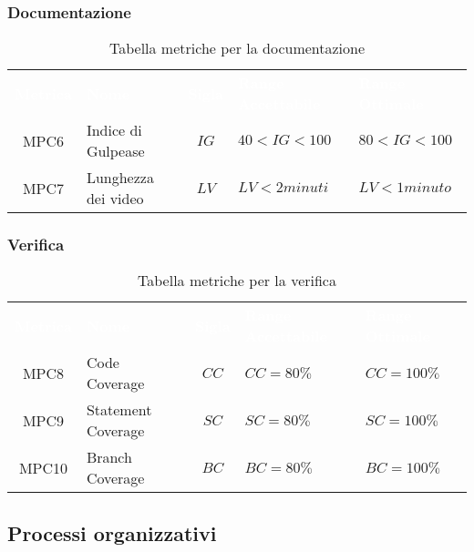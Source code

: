 \subsubsection{Documentazione}
    \renewcommand{\arraystretch}{1.5}
    \begin{longtable}{ c C{4cm} c C{3.5cm} C{3.5cm}}
    	\caption{Tabella metriche per la documentazione}\\
    	\textcolor{white}{\textbf{Metrica}} & \textcolor{white}{\textbf{Nome}} & \textcolor{white}{\textbf{Sigla}} & \textcolor{white}{\textbf{Range Accettabile}} & \textcolor{white}{\textbf{Range Ottimale}}\\
    	MPC6 & Indice di Gulpease & $IG$ & $40 < IG < 100$ & $80 < IG < 100$ \\
    	MPC7 & Lunghezza dei video & $LV$ & $LV < 2 minuti$ & $LV < 1 minuto$ \\
    \end{longtable}
\vspace{0.3cm}
\subsubsection{Verifica}
    \renewcommand{\arraystretch}{1.5}
    \begin{longtable}{ c C{4cm} c C{3.5cm} C{3.5cm}}
    	\caption{Tabella metriche per la verifica}\\
    	\textcolor{white}{\textbf{Metrica}} & \textcolor{white}{\textbf{Nome}} & \textcolor{white}{\textbf{Sigla}} & \textcolor{white}{\textbf{Range Accettabile}} & \textcolor{white}{\textbf{Range Ottimale}}\\
    	MPC8 & Code Coverage & $CC$ & $CC = 80\%$ & $CC = 100\%$  \\
    	MPC9 & Statement Coverage & $SC$ & $SC = 80\%$ & $SC = 100\%$ \\
    	MPC10 & Branch Coverage & $BC$ & $BC = 80\%$ & $BC = 100\%$ \\
    \end{longtable}
\vspace{0.3cm}
\subsection{Processi organizzativi}

